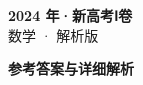 \documentclass[zihao=-4, a4paper]{ctexart}
\begin{document}
\begin{center}
  {\Large\bfseries 2024 年·新高考Ⅰ卷}\\[4pt]
  {\large 数学 · 解析版}
\end{center}
\medskip
{}

\clearpage
{}
\begin{center}{\Large\bfseries 参考答案与详细解析}\end{center}
\medskip

\end{document}
